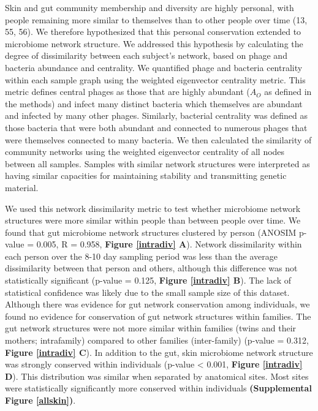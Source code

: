 \documentclass[12pt,]{article}
\begin{document}
Skin and gut community membership and diversity are highly personal,
with people remaining more similar to themselves than to other people
over time (13, 55, 56). We therefore hypothesized that this personal
conservation extended to microbiome network structure. We addressed this
hypothesis by calculating the degree of dissimilarity between each
subject's network, based on phage and bacteria abundance and centrality.
We quantified phage and bacteria centrality within each sample graph
using the weighted eigenvector centrality metric. This metric defines
central phages as those that are highly abundant (\(A_{O}\) as defined
in the methods) and infect many distinct bacteria which themselves are
abundant and infected by many other phages. Similarly, bacterial
centrality was defined as those bacteria that were both abundant and
connected to numerous phages that were themselves connected to many
bacteria. We then calculated the similarity of community networks using
the weighted eigenvector centrality of all nodes between all samples.
Samples with similar network structures were interpreted as having
similar capacities for maintaining stability and transmitting genetic
material.

We used this network dissimilarity metric to test whether microbiome
network structures were more similar within people than between people
over time. We found that gut microbiome network structures clustered by
person (ANOSIM p-value = 0.005, R = 0.958, \textbf{Figure \ref{intradiv}
A}). Network dissimilarity within each person over the 8-10 day sampling
period was less than the average dissimilarity between that person and
others, although this difference was not statistically significant
(p-value = 0.125, \textbf{Figure \ref{intradiv} B}). The lack of
statistical confidence was likely due to the small sample size of this
dataset. Although there was evidence for gut network conservation among
individuals, we found no evidence for conservation of gut network
structures within families. The gut network structures were not more
similar within families (twins and their mothers; intrafamily) compared
to other families (inter-family) (p-value = 0.312, \textbf{Figure
\ref{intradiv} C}). In addition to the gut, skin microbiome network
structure was strongly conserved within individuals (p-value \textless{}
0.001, \textbf{Figure \ref{intradiv} D}). This distribution was similar
when separated by anatomical sites. Most sites were statistically
significantly more conserved within individuals \textbf{(Supplemental
Figure \ref{allskin})}.
\end{document}
